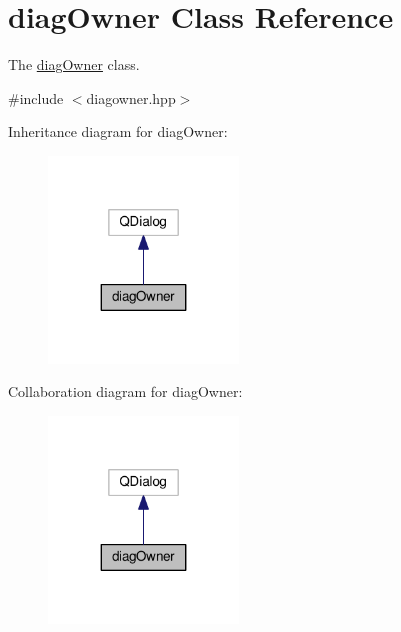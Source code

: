\hypertarget{classdiagOwner}{}\section{diag\+Owner Class Reference}
\label{classdiagOwner}


The \hyperlink{classdiagOwner}{diag\+Owner} class.  




{\ttfamily \#include $<$diagowner.\+hpp$>$}



Inheritance diagram for diag\+Owner\+:
\nopagebreak
\begin{figure}[H]
\begin{center}
\leavevmode
\includegraphics[width=143pt]{classdiagOwner__inherit__graph}
\end{center}
\end{figure}


Collaboration diagram for diag\+Owner\+:
\nopagebreak
\begin{figure}[H]
\begin{center}
\leavevmode
\includegraphics[width=143pt]{classdiagOwner__coll__graph}
\end{center}
\end{figure}
